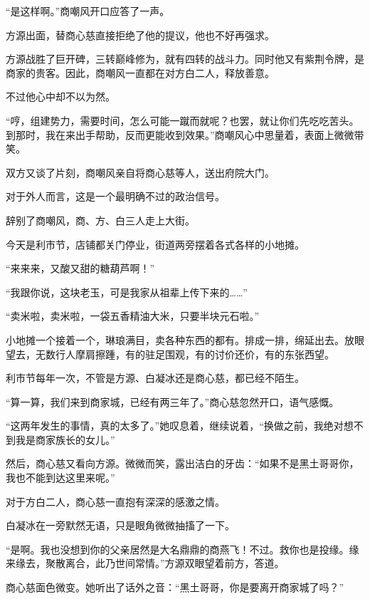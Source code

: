 
\begin{this_body}



“是这样啊。”商嘲风开口应答了一声。

方源出面，替商心慈直接拒绝了他的提议，他也不好再强求。

方源战胜了巨开碑，三转巅峰修为，就有四转的战斗力。同时他又有紫荆令牌，是商家的贵客。因此，商嘲风一直都在对方白二人，释放善意。

不过他心中却不以为然。

“哼，组建势力，需要时间，怎么可能一蹴而就呢？也罢，就让你们先吃吃苦头。到那时，我在来出手帮助，反而更能收到效果。”商嘲风心中思量着，表面上微微带笑。

双方又谈了片刻，商嘲风亲自将商心慈等人，送出府院大门。

对于外人而言，这是一个最明确不过的政治信号。

辞别了商嘲风，商、方、白三人走上大街。

今天是利市节，店铺都关门停业，街道两旁摆着各式各样的小地摊。

“来来来，又酸又甜的糖葫芦啊！”

“我跟你说，这块老玉，可是我家从祖辈上传下来的……”

“卖米啦，卖米啦，一袋五香精油大米，只要半块元石啦。”

小地摊一个接着一个，琳琅满目，卖各种东西的都有。排成一排，绵延出去。放眼望去，无数行人摩肩擦踵，有的驻足围观，有的讨价还价，有的东张西望。

利市节每年一次，不管是方源、白凝冰还是商心慈，都已经不陌生。

“算一算，我们来到商家城，已经有两三年了。”商心慈忽然开口，语气感慨。

“这两年发生的事情，真的太多了。”她叹息着，继续说着，“换做之前，我绝对想不到我是商家族长的女儿。”

然后，商心慈又看向方源。微微而笑，露出洁白的牙齿：“如果不是黑土哥哥你，我也不能到达这里来呢。”

对于方白二人，商心慈一直抱有深深的感激之情。

白凝冰在一旁默然无语，只是眼角微微抽搐了一下。

“是啊。我也没想到你的父亲居然是大名鼎鼎的商燕飞！不过。救你也是投缘。缘来缘去，聚散离合，此乃世间常情。”方源双眼望着前方，答道。

商心慈面色微变。她听出了话外之音：“黑土哥哥，你是要离开商家城了吗？”


\end{this_body}
